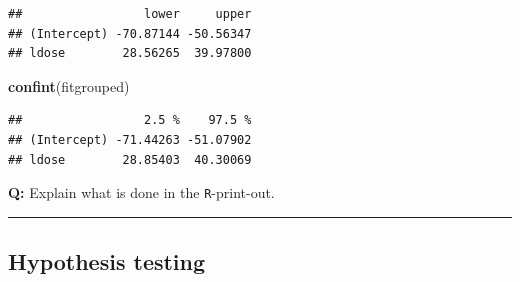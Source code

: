 \documentclass[
]{article}
\newenvironment{Shaded}{\begin{snugshade}}{\end{snugshade}}
\newcommand{\AttributeTok}[1]{\textcolor[rgb]{0.13,0.29,0.53}{#1}}
\newcommand{\DecValTok}[1]{\textcolor[rgb]{0.00,0.00,0.81}{#1}}
\newcommand{\FloatTok}[1]{\textcolor[rgb]{0.00,0.00,0.81}{#1}}
\newcommand{\FunctionTok}[1]{\textcolor[rgb]{0.13,0.29,0.53}{\textbf{#1}}}
\newcommand{\NormalTok}[1]{#1}
\newcommand{\OtherTok}[1]{\textcolor[rgb]{0.56,0.35,0.01}{#1}}
\newcommand{\SpecialCharTok}[1]{\textcolor[rgb]{0.81,0.36,0.00}{\textbf{#1}}}
\newcommand{\StringTok}[1]{\textcolor[rgb]{0.31,0.60,0.02}{#1}}
\begin{document}
\begin{Shaded}
\end{Shaded}

\begin{verbatim}
##                 lower     upper
## (Intercept) -70.87144 -50.56347
## ldose        28.56265  39.97800
\end{verbatim}

\begin{Shaded}
\begin{Highlighting}[]
\FunctionTok{confint}\NormalTok{(fitgrouped)}
\end{Highlighting}
\end{Shaded}

\begin{verbatim}
##                 2.5 %    97.5 %
## (Intercept) -71.44263 -51.07902
## ldose        28.85403  40.30069
\end{verbatim}

\textbf{Q:} Explain what is done in the \texttt{R}-print-out.

\begin{center}\rule{0.5\linewidth}{0.5pt}\end{center}

\hypertarget{hypothesis-testing}{%
\subsection{Hypothesis testing}\label{hypothesis-testing}}
\end{document}
